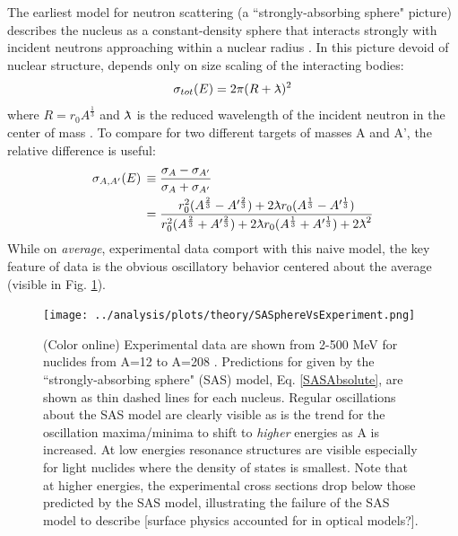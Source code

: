 The earliest model for neutron scattering (a ``strongly-absorbing sphere"
picture) describes the nucleus as a constant-density sphere that interacts
strongly with incident neutrons approaching within a nuclear radius
\cite{Feshbach1949}. In this picture devoid of nuclear structure, \totEs depends
only on size scaling of the interacting bodies:
\begin{equation} \label{SASAbsolute}
    \sigma_{tot}(E) = 2\pi(R + \lambdabar)^{2}
\end{equation}
where $R=r_{0}A^{\frac{1}{3}}$ and $\lambdabar$ is the reduced wavelength
of the incident neutron in the center of mass \cite{Fernbach1949, Satchler1980}. 
To compare \totEs for two different targets of masses A and A', the relative
difference \totRDs is useful:
\begin{equation} \label{SASRelDiff}
    \begin{split}
        \totRDs & \equiv
    \frac{\sigma_{A}-\sigma_{A'}}{\sigma_{A}+\sigma_{A'}} \\
    & =
    \frac{r_{0}^{2}(A^{\frac{2}{3}}-A'^{\frac{2}{3}}) +
    2\lambdabar r_{0}(A^{\frac{1}{3}}-A'^{\frac{1}{3}})}
    {r_{0}^{2}(A^{\frac{2}{3}}+A'^{\frac{2}{3}}) +
    2\lambdabar r_{0}(A^{\frac{1}{3}}+A'^{\frac{1}{3}}) + 2\lambdabar^{2}}
    \end{split}
\end{equation}
While on \textit{average}, experimental data comport with this naive
model, the key feature of \totEs data is the obvious oscillatory
behavior centered about the average (visible in Fig.
\ref{SASphereVsExperiment}).

\begin{figure}
    \texttt{[image: ../analysis/plots/theory/SASphereVsExperiment.png]}
    \caption{(Color online) Experimental \totEs data are shown from 2-500
        MeV for nuclides from A=12 to A=208
        \cite{Finlay1993, Schwartz1974, Poenitz1983, Abfalterer2000, Abfalterer2001}.
        Predictions for \totEs given by the ``strongly-absorbing sphere" (SAS)
        model, Eq. \ref{SASAbsolute}, are shown as thin dashed lines for each nucleus.
        Regular oscillations about the SAS model are clearly visible
        as is the trend for the oscillation
        maxima/minima to shift to \textit{higher} energies as A is increased. At low energies 
        resonance structures are visible especially for light nuclides where the
        density of states is smallest. Note that at higher energies, the experimental
        cross sections drop below those predicted by the SAS model, illustrating
    the failure of the SAS model to describe [surface physics accounted for in
optical models?].}
    \label{SASphereVsExperiment}
\end{figure}


